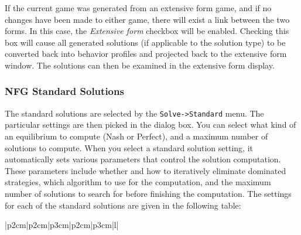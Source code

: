 If the current game was generated from an extensive form game, and if no
changes have been made to either game, there will exist a link between the
two forms.  In this case, the {\em Extensive form} checkbox will be
enabled.  Checking this box will cause all generated solutions (if
applicable to the solution type) to be converted back into behavior
profiles and projected back to the extensive form window.  The solutions
can then be examined in the extensive form display.

\subsubsection{NFG Standard Solutions}\label{NFGStandardSolutions}

The standard solutions are selected by the {\tt Solve->Standard} menu.  The
particular settings are then picked in the dialog box.  You can select what kind of 
an equilibrium to compute (Nash or Perfect), 
and a maximum number of solutions to 
compute.  When you select a standard solution setting, it automatically sets various 
parameters that control the solution computation.  These parameters include 
whether and how to iteratively eliminate dominated strategies, 
which algorithm to use for the computation, and the maximum number of 
solutions to search for 
before finishing the computation.  The settings for each of the standard solutions are 
given in the following table:

\begin{tabular}{|p{2cm}|p{2cm}|p{3cm}|p{2cm}|p{3cm}|l|}
\hline
{}
\hline
{}
\hline
{}
\hline
\hline
{}
\hline
{}
\hline
{}
\hline
\end{tabular}

